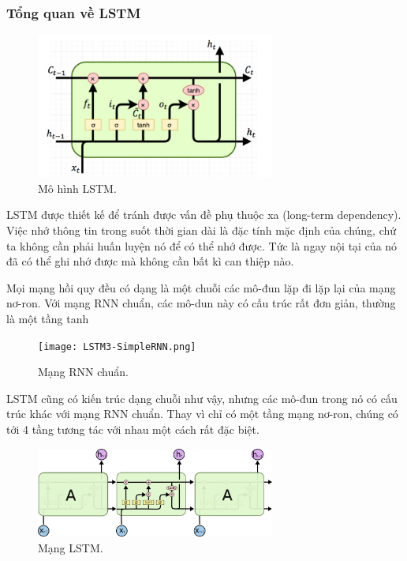 \subsubsection{Tổng quan về LSTM}

\begin{figure}[h!]
	\centering
	\includegraphics[width=0.7\textwidth]{Figures/lstm-all.jpg}
	\caption[Mô hình LSTM.]{Mô hình LSTM.}
	\label{fig:lstm-all.jpg} 
\end{figure}
LSTM được thiết kế để tránh được vấn đề phụ thuộc xa (long-term dependency). Việc nhớ thông tin trong suốt thời gian dài là đặc tính mặc định của chúng, chứ ta không cần phải huấn luyện nó để có thể nhớ được. Tức là ngay nội tại của nó đã có thể ghi nhớ được mà không cần bất kì can thiệp nào.

Mọi mạng hồi quy đều có dạng là một chuỗi các mô-đun lặp đi lặp lại của mạng nơ-ron. Với mạng RNN chuẩn, các mô-dun này có cấu trúc rất đơn giản, thường là một tầng tanh
\begin{figure}[h!]
	\centering
	\texttt{[image: LSTM3-SimpleRNN.png]}
	\caption[Mạng RNN chuẩn.]{Mạng RNN chuẩn.}
	\label{fig:LSTM3-SimpleRNN.png} 
\end{figure}
LSTM cũng có kiến trúc dạng chuỗi như vậy, nhưng các mô-đun trong nó có cấu trúc khác với mạng RNN chuẩn. Thay vì chỉ có một tầng mạng nơ-ron, chúng có tới 4 tầng tương tác với nhau một cách rất đặc biệt.

\begin{figure}[h!]
	\centering
	\includegraphics[width=0.7\textwidth]{Figures/LSTM3-chain.png}
	\caption[Mạng LSTM.]{Mạng LSTM.}
	\label{fig:LSTM.png} 
\end{figure}
